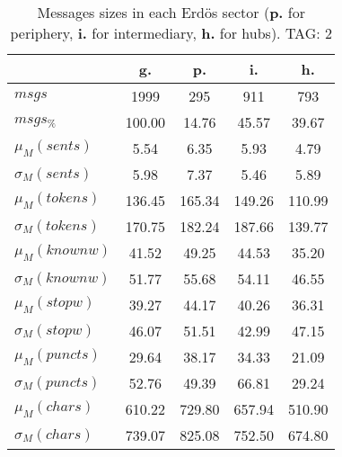 \begin{table}[h!]
\begin{center}
\begin{tabular}{| l | c | c | c | c |}\hline
 & g. & p. & i. & h. \\\hline
$msgs$ & 1999  & 295  & 911  & 793 \\\hline
$msgs_{\%}$ & 100.00  & 14.76  & 45.57  & 39.67 \\\hline
$\mu_M(sents)$ & 5.54  & 6.35  & 5.93  & 4.79 \\\hline
$\sigma_M(sents)$ & 5.98  & 7.37  & 5.46  & 5.89 \\\hline
$\mu_M(tokens)$ & 136.45  & 165.34  & 149.26  & 110.99 \\\hline
$\sigma_M(tokens)$ & 170.75  & 182.24  & 187.66  & 139.77 \\\hline
$\mu_M(knownw)$ & 41.52  & 49.25  & 44.53  & 35.20 \\\hline
$\sigma_M(knownw)$ & 51.77  & 55.68  & 54.11  & 46.55 \\\hline
$\mu_M(stopw)$ & 39.27  & 44.17  & 40.26  & 36.31 \\\hline
$\sigma_M(stopw)$ & 46.07  & 51.51  & 42.99  & 47.15 \\\hline
$\mu_M(puncts)$ & 29.64  & 38.17  & 34.33  & 21.09 \\\hline
$\sigma_M(puncts)$ & 52.76  & 49.39  & 66.81  & 29.24 \\\hline
$\mu_M(chars)$ & 610.22  & 729.80  & 657.94  & 510.90 \\\hline
$\sigma_M(chars)$ & 739.07  & 825.08  & 752.50  & 674.80 \\\hline
\end{tabular}
\caption{Messages sizes in each Erd\"os sector ({{\bf p.}} for periphery, {{\bf i.}} for intermediary, {{\bf h.}} for hubs). TAG: 2}
\end{center}
\end{table}